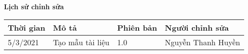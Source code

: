 \documentclass[./main.tex]{subfiles}
\begin{document}
	\begin{center}
		\Large{\textbf{Lịch sử chỉnh sửa}}
		\begin{table}[H]
		\begin{tabular}{|p{}|p{}|p{}|p{}|}
				\hline
				\textbf{Thời gian} & \textbf{Mô tả}   & \textbf{Phiên bản} & \textbf{Người chỉnh sửa}                                                 \\ \hline
				5/3/2021  & Tạo mẫu tài liệu             & 1.0 & Nguyễn Thanh Huyền \\ \hline
				
				
			\end{tabular}
		\end{table}
	\end{center}
	
\end{document}
